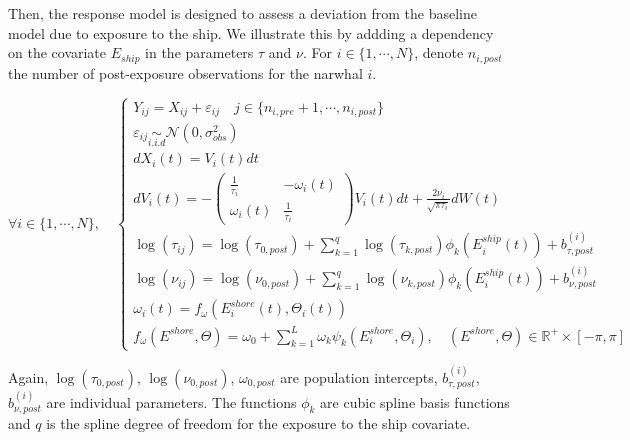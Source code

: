 \documentclass[11pt]{article}
\newcommand {\R}{\mathbb{R}}
\newcommand {\1}{\mathbb{1}}
\begin{document}
Then, the response model is designed to assess a deviation from the baseline model due to exposure to the ship. We illustrate this by addding a dependency on the covariate $E_{ship}$ in the parameters $\tau$ and $\nu$. 
For $i \in \{1, \cdots, N\}$, denote $n_{i,post}$ the number of post-exposure observations for the narwhal $i$.

\begin{equation}  \forall i \in \{1,\cdots,N\}, \quad \left\{
	\begin{array}{l}
		Y_{ij}=X_{ij}+\varepsilon_{ij} \quad j \in \{n_{i,pre}+1,\cdots,n_{i,post}\}\\
		\varepsilon_{ij} \underset{i.i.d}{\sim} \mathcal{N}(0,\sigma_{obs}^2)  \\
		dX_i(t)=V_i(t)dt  \\
		dV_i(t)=-\begin{pmatrix} 
			\frac{1}{\tau_i} & -\omega_i(t) \\
			\omega_i(t) & \frac{1}{\tau_i}
		\end{pmatrix}V_i(t)dt+\frac{2\nu_i}{\sqrt{\pi \tau_i}} dW(t) \\
		\log(\tau_{ij})=\log(\tau_{0,post}) +\sum_{k=1}^{q} \log(\tau_{k,post})\phi_{k}(E^{ship}_i(t))+b^{(i)}_{\tau,post} \\
		\log(\nu_{ij})=\log(\nu_{0,post}) +  \sum_{k=1}^{q} \log(\nu_{k,post}) \phi_{k}(E^{ship}_i(t)) +b^{(i)}_{\nu,post}  \\
		\omega_i(t)=f_{\omega}(E^{shore}_i(t),\Theta_i(t))\\
		f_{\omega}(E^{shore},\Theta)=\omega_{0}+\sum_{k=1}^{L} \omega_{k} \psi_k(E^{shore}_i,\Theta_i), \quad (E^{shore},\Theta) \in \R^+ \times [-\pi,\pi]
	\end{array}
	\right.
	\label{eq: exact response model}
\end{equation}


Again, $\log(\tau_{0,post})$, $\log(\nu_{0,post})$, $\omega_{0,post}$ are population intercepts, $b^{(i)}_{\tau,post}$,$b^{(i)}_{\nu,post}$ are individual parameters. The functions $\phi_k$ are cubic spline basis functions and $q$ is the spline degree of freedom for the exposure to the ship covariate.
\end{document}
